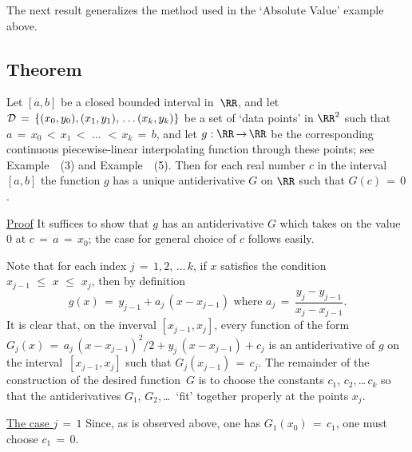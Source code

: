 {\V

        The next result generalizes the method used in the `Absolute Value' example above.

\V

             \subsection{\small{\bf Theorem}}
            \label{ThmE45.125A}

\V

        Let $[a,b]$ be a closed bounded interval in~${\RR}$, and let ${\cal D} \,=\, \{(x_{0},y_{0}), (x_{1},y_{1}),\,{\ldots}\,(x_{k},y_{k})\}$
    be a set of `data points' in ${\RR}^{2}$ such that $a \,=\, x_{0}\,<\,x_{1}\,<\,\,{\ldots}\,\,<\,x_{k} \,=\, b$,
    and let $g:{\RR} \,{\rightarrow}\, {\RR}$ be the corresponding continuous piecewise-linear interpolating function through these points;
    see Example~~(3) and Example~~(5). Then for each real number $c$ in the interval $[a,b]$
    the function $g$ has a unique antiderivative $G$ on ${\RR}$ such that $G(c) \,=\, 0$.

\V

        \underline{Proof} It suffices to show that $g$ has an antiderivative $G$ which takes on the value $0$ at $c \,=\, a \,=\, x_{0}$;
    the case for general choice of $c$ follows easily.

        Note that for each index $j \,=\, 1,2,\,{\ldots}\,k$, if $x$ satisfies the condition $x_{j-1}\,\,{\leq}\,\,x\,\,{\leq}\,\,x_{j}$, then by definition
        \begin{displaymath}
        g(x) \,=\, y_{j-1} + a_{j}\,(x-x_{j-1}) \mbox{ where } a_{j} \,=\, \frac{y_{j} - y_{j-1}}{x_{j} - x_{j-1}}.
        \end{displaymath}
    It is clear that, on the inverval $[x_{j-1},x_{j}]$,
    every function of the form $G_{j}(x) \,=\, a_{j}\,(x-x_{j-1})^{2}/2 + y_{j}\,(x-x_{j-1}) + c_{j}$
    is an antiderivative of $g$ on the interval~$[x_{j-1},x_{j}]$ such that $G_{j}(x_{j-1}) \,=\, c_{j}$.
    The remainder of the construction of the desired function~$G$ is to choose the constants
    $c_{1}$, $c_{2}$,\,{\ldots}\,$c_{k}$ so that the antiderivatives $G_{1}$, $G_{2}$,\,{\ldots}\, `fit' together properly at the points $x_{j}$.

        \underline{The case $j \,=\, 1$} Since, as is observed above, one has $G_{1}(x_{0}) \,=\, c_{1}$, one must choose $c_{1} \,=\, 0$.

}
